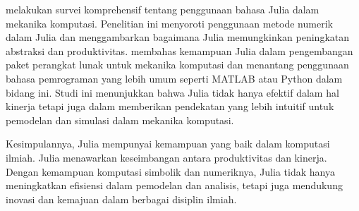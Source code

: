 \cite{xiaoJuliaLanguageComputational2022b} melakukan survei komprehensif tentang
penggunaan bahasa Julia dalam mekanika komputasi. Penelitian ini menyoroti penggunaan
metode numerik dalam Julia dan menggambarkan bagaimana Julia memungkinkan peningkatan
abstraksi dan produktivitas. \cite{xiaoJuliaLanguageComputational2022b} membahas
kemampuan Julia dalam pengembangan paket perangkat lunak untuk mekanika
komputasi dan menantang penggunaan bahasa pemrograman yang lebih umum seperti
MATLAB atau Python dalam bidang ini. Studi ini menunjukkan bahwa Julia tidak hanya
efektif dalam hal kinerja tetapi juga dalam memberikan pendekatan yang lebih intuitif
untuk pemodelan dan simulasi dalam mekanika komputasi.

Kesimpulannya, Julia mempunyai kemampuan yang baik dalam komputasi ilmiah.
Julia menawarkan keseimbangan antara produktivitas dan kinerja. Dengan
kemampuan komputasi simbolik dan numeriknya, Julia tidak hanya meningkatkan
efisiensi dalam pemodelan dan analisis, tetapi juga mendukung inovasi dan
kemajuan dalam berbagai disiplin ilmiah.








